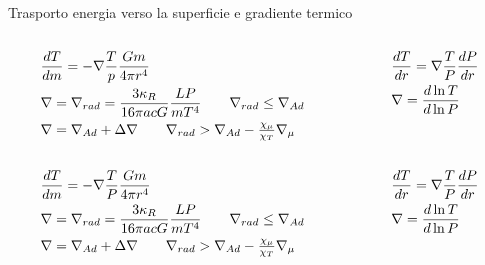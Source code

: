 \begin{frame}{Trasporto energia verso la superficie e gradiente termico}
\begin{columns}[T]
	\begin{column}{0.6\textwidth}
		\begin{align*}
		&\TDy{m}{T}=-\nabla\frac{T}{p}\frac{Gm}{4\pi r^4}\\
		&\nabla=\nrad=\frac{3\kappa_R}{16\pi acG}\frac{LP}{mT^4}\tag*{$\nrad\leq\nad$}\\
		&\nabla=\nad+\Delta\nabla\tag*{$\nrad>\nad-\frac{\chi_{\mu}}{\chi_T}\nmu$}
		\end{align*}
	\end{column}\begin{column}{0.4\textwidth}
		\begin{align*}
		&\TDy{r}{T}=\nabla\frac{T}{P}\TDy{r}{P}\\
		&\nabla=\TDly{P}{T}
		\end{align*}
	\end{column}
\end{columns}
\begin{columns}[T]
	\begin{column}{0.6\textwidth}
		\begin{align*}
		&\TDy{m}{T}=-\nabla\frac{T}{P}\frac{Gm}{4\pi r^4}\\
		&\nabla=\nrad=\frac{3\kappa_R}{16\pi acG}\frac{LP}{mT^4}\tag*{$\nrad\leq\nad$}\\
		&\nabla=\nad+\Delta\nabla\tag*{$\nrad>\nad-\frac{\chi_{\mu}}{\chi_T}\nmu$}
		\end{align*}
	\end{column}\begin{column}{0.4\textwidth}
		\begin{align*}
		&\TDy{r}{T}=\nabla\frac{T}{P}\TDy{r}{P}\\
		&\nabla=\TDly{P}{T}
		\end{align*}
	\end{column}
\end{columns}
\end{frame}


